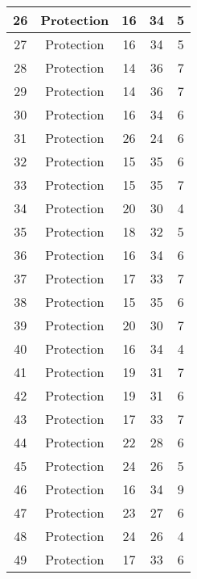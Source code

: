 \documentclass[results.tex]{subfiles}
\begin{document}
\begin{center}
\begin{tabular}{| c || c | c | c | c |}
    \hline
    26 & Protection & 16 & 34 & 5 \\ 
    \hline
    27 & Protection & 16 & 34 & 5 \\ 
    \hline
    28 & Protection & 14 & 36 & 7 \\ 
    \hline
    29 & Protection & 14 & 36 & 7 \\ 
    \hline
    30 & Protection & 16 & 34 & 6 \\ 
    \hline
    31 & Protection & 26 & 24 & 6 \\ 
    \hline
    32 & Protection & 15 & 35 & 6 \\ 
    \hline
    33 & Protection & 15 & 35 & 7 \\ 
    \hline
    34 & Protection & 20 & 30 & 4 \\ 
    \hline
    35 & Protection & 18 & 32 & 5 \\ 
    \hline
    36 & Protection & 16 & 34 & 6 \\ 
    \hline
    37 & Protection & 17 & 33 & 7 \\ 
    \hline
    38 & Protection & 15 & 35 & 6 \\ 
    \hline
    39 & Protection & 20 & 30 & 7 \\ 
    \hline
    40 & Protection & 16 & 34 & 4 \\ 
    \hline
    41 & Protection & 19 & 31 & 7 \\ 
    \hline
    42 & Protection & 19 & 31 & 6 \\ 
    \hline
    43 & Protection & 17 & 33 & 7 \\ 
    \hline
    44 & Protection & 22 & 28 & 6 \\ 
    \hline
    45 & Protection & 24 & 26 & 5 \\ 
    \hline
    46 & Protection & 16 & 34 & 9 \\ 
    \hline
    47 & Protection & 23 & 27 & 6 \\ 
    \hline
    48 & Protection & 24 & 26 & 4 \\ 
    \hline
    49 & Protection & 17 & 33 & 6 \\ 
    \hline   \end{tabular}
\end{center}
\end{document}

